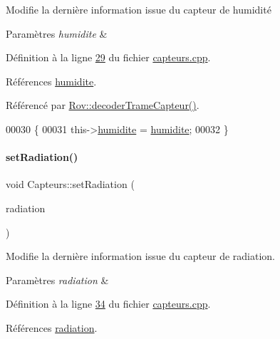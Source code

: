 Modifie la dernière information issue du capteur de humidité 


\begin{DoxyParams}{Paramètres}
{\em humidite} & \\
\hline
\end{DoxyParams}


Définition à la ligne \hyperlink{capteurs_8cpp_source_l00029}{29} du fichier \hyperlink{capteurs_8cpp_source}{capteurs.\+cpp}.



Références \hyperlink{capteurs_8h_source_l00024}{humidite}.



Référencé par \hyperlink{rov_8cpp_source_l00086}{Rov\+::decoder\+Trame\+Capteur()}.


\begin{DoxyCode}
00030 \{
00031     this->\hyperlink{class_capteurs_a8967c76dbc9c1f2ff8339cb8f00c3adb}{humidite} = \hyperlink{class_capteurs_a8967c76dbc9c1f2ff8339cb8f00c3adb}{humidite};
00032 \}
\end{DoxyCode}
\mbox{\label{class_capteurs_a8692d145188df3129d88fef77efbb7b0}} 
\paragraph{\texorpdfstring{set\+Radiation()}{setRadiation()}}
{\footnotesize\ttfamily void Capteurs\+::set\+Radiation (\begin{DoxyParamCaption}\item[{Q\+String}]{radiation }\end{DoxyParamCaption})}



Modifie la dernière information issue du capteur de radiation. 


\begin{DoxyParams}{Paramètres}
{\em radiation} & \\
\hline
\end{DoxyParams}


Définition à la ligne \hyperlink{capteurs_8cpp_source_l00034}{34} du fichier \hyperlink{capteurs_8cpp_source}{capteurs.\+cpp}.



Références \hyperlink{capteurs_8h_source_l00025}{radiation}.



